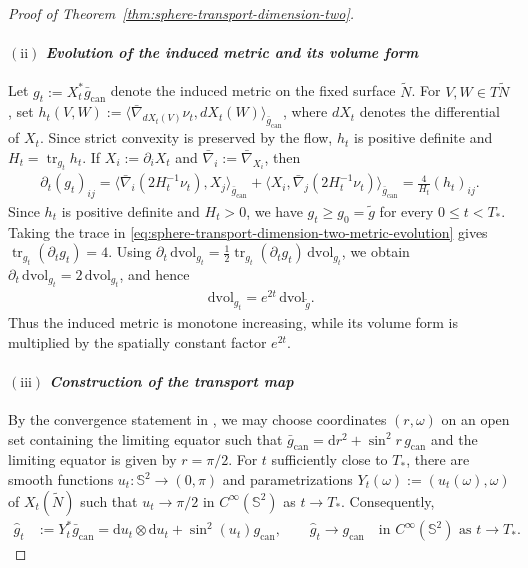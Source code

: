 \documentclass[11pt,reqno]{amsart}
\numberwithin{equation}{section}
\theoremstyle{definition}
\theoremstyle{remark}
\def\bS {\mathbb{S}}
\newcommand{\la}{\langle}
\newcommand{\ra}{\rangle}
\newcommand{\ud}{\mathrm{d}}
\newcommand{\0}{\emptyset}
\newcommand{\can}{\mathrm{can}}
\newcommand{\dvol}{\,\mathrm{dvol}}
\begin{document}
\begin{proof}[Proof of Theorem~\ref{thm:sphere-transport-dimension-two}]
\paragraph{$\mathrm{(ii)}$ \textit{Evolution of the induced metric and its volume form}}
Let $g_t:=X_t^*\bar g_{\can}$ denote the induced metric on the fixed surface
$\widetilde N$. For $V,W\in T\widetilde N$, set
$h_t(V,W):=\la\bar\nabla_{dX_t(V)}\nu_t,dX_t(W)\ra_{\bar g_{\can}}$,
where $dX_t$ denotes the differential of $X_t$. Since strict convexity is
preserved by the flow, $h_t$ is positive definite and
$H_t=\operatorname{tr}_{g_t}h_t$. If $X_i:=\partial_iX_t$ and
$\bar\nabla_i:=\bar\nabla_{X_i}$, then
\begin{align}\label{eq:sphere-transport-dimension-two-metric-evolution}
        \partial_t(g_t)_{ij}
        =
        \la\bar\nabla_i(2H_t^{-1}\nu_t),X_j\ra_{\bar g_{\can}}
        +
        \la X_i,\bar\nabla_j(2H_t^{-1}\nu_t)\ra_{\bar g_{\can}}
        =
        \frac{4}{H_t}(h_t)_{ij}.
\end{align}
Since $h_t$ is positive definite and $H_t>0$, we have
$g_t\geq g_0=\widetilde g$ for every $0\leq t<T_*$. Taking the trace in
\eqref{eq:sphere-transport-dimension-two-metric-evolution} gives
$\operatorname{tr}_{g_t}(\partial_tg_t)=4$. Using
$\partial_t\dvol_{g_t}=\frac12\operatorname{tr}_{g_t}(\partial_tg_t)
\dvol_{g_t}$, we obtain $\partial_t\dvol_{g_t}=2\dvol_{g_t}$, and hence
\begin{align}\label{eq:sphere-transport-dimension-two-volume-scaling}
        \dvol_{g_t}
        =
        e^{2t}\dvol_{\widetilde g}.
\end{align}
Thus the induced metric is monotone increasing, while its volume form is
multiplied by the spatially constant factor $e^{2t}$.

\paragraph{$\mathrm{(iii)}$ \textit{Construction of the transport map}}
By the convergence statement in \cite[Theorem~1.1]{gerhardt2015curvature}, we
may choose coordinates $(r,\omega)$ on an open set containing the limiting
equator such that
$\bar g_{\can}=\ud r^2+\sin^2r\,g_{\can}$ and the limiting equator is given by
$r=\pi/2$. For $t$ sufficiently close to $T_*$, there are smooth functions
$u_t:\bS^2\to(0,\pi)$ and parametrizations
$Y_t(\omega):=(u_t(\omega),\omega)$ of $X_t(\widetilde N)$ such that
$u_t\to\pi/2$ in $C^\infty(\bS^2)$ as $t\to T_*$. Consequently,
\begin{align}\label{eq:sphere-transport-dimension-two-source-convergence}
        \widehat g_t
        &:=
        Y_t^*\bar g_{\can}
        =
        \ud u_t\otimes\ud u_t+\sin^2(u_t)g_{\can},
        \qquad
        \widehat g_t
        \rightarrow
        g_{\can}
        \quad
        \text{in }C^\infty(\bS^2)
        \text{ as }t\to T_*.
\end{align}


\end{proof}
\end{document}

